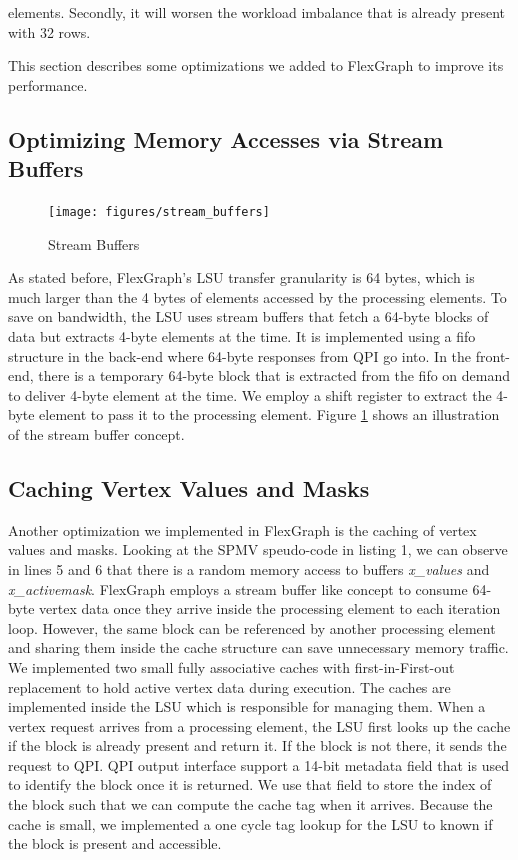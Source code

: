 elements. Secondly, it will worsen the workload imbalance that is already present with 32 rows.     

This section describes some optimizations we added to FlexGraph to improve its performance. 

\subsection{Optimizing Memory Accesses via Stream Buffers}

\begin{figure}[htbp]
\centering
\texttt{[image: figures/stream\_buffers]}
\caption{Stream Buffers}
\label{fig:stream_buffers}
\end{figure}

As stated before, FlexGraph's LSU transfer granularity is 64 bytes, which is much larger than the 4 bytes of elements accessed by the processing elements. To save on bandwidth, the LSU uses stream buffers that fetch a 64-byte blocks of data but extracts 4-byte elements at the time. It is implemented using a fifo structure in the back-end where 64-byte responses from QPI go
 into. In the front-end, there is a temporary 64-byte block that is extracted from the fifo on demand to deliver 4-byte element at the time. We employ a shift register to extract the 4-byte element to pass it to the processing element. Figure \ref{fig:stream_buffers} shows an illustration of the stream buffer concept.
   
\subsection{Caching Vertex Values and Masks}

Another optimization we implemented in FlexGraph is the caching of vertex values and masks. Looking at the SPMV speudo-code in listing 1, we can observe in lines 5 and 6 that there is a random memory access to buffers \textit{x\_values} and \textit{x\_activemask}. FlexGraph employs a stream buffer like concept to consume 64-byte vertex data once they arrive inside the processing element to each iteration loop. However, the same block can be referenced by another processing element and sharing them inside the cache structure can save unnecessary memory traffic. We implemented two small fully associative caches with first-in-First-out replacement to hold active vertex data during execution. The caches are implemented inside the LSU which is responsible for managing them. When a vertex request arrives from a processing element, the LSU first looks up the cache if the block is already present and return it. If the block is not there, it sends the request to QPI. QPI output interface support a 14-bit metadata field that is used to identify the block once it is returned. We use that field to store the index of the block such that we can compute the cache tag when it arrives. Because the cache is small, we implemented a one cycle tag lookup for the LSU to known if the block is present and accessible.

